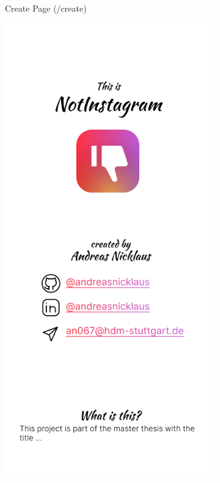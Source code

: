 \documentclass[a4paper, fontsize=11pt]{article}
\begin{document}
\begin{figure}[ht!]
\begin{subfigure}{0.49\linewidth}
\begin{center}
    \end{center}
    \caption{Create Page (/create)}\label{subfig:create}
  \end{subfigure}
  \begin{subfigure}{0.49\linewidth}
    \begin{center}
      \includegraphics[width=\linewidth, height=0.3\textheight, keepaspectratio]{img/ig-clone/Informationsseite.png}

\end{center}
\end{subfigure}
\end{figure}
\end{document}
